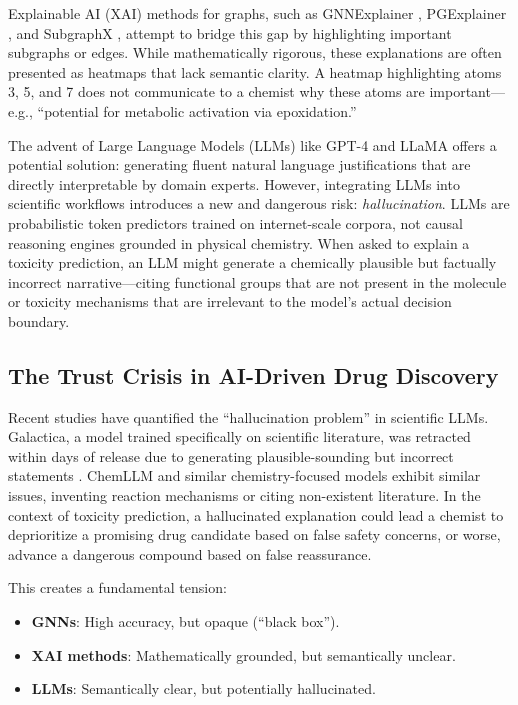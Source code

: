 \documentclass[conference]{IEEEtran}
\begin{document}
Explainable AI (XAI) methods for graphs, such as GNNExplainer \cite{ying2019gnnexplainer}, PGExplainer \cite{luo2020parameterized}, and SubgraphX \cite{yuan2021explainability}, attempt to bridge this gap by highlighting important subgraphs or edges. While mathematically rigorous, these explanations are often presented as heatmaps that lack semantic clarity. A heatmap highlighting atoms 3, 5, and 7 does not communicate to a chemist why these atoms are important---e.g., ``potential for metabolic activation via epoxidation.''

The advent of Large Language Models (LLMs) like GPT-4 \cite{openai2023gpt4} and LLaMA \cite{touvron2023llama} offers a potential solution: generating fluent natural language justifications that are directly interpretable by domain experts. However, integrating LLMs into scientific workflows introduces a new and dangerous risk: \textit{hallucination}. LLMs are probabilistic token predictors trained on internet-scale corpora, not causal reasoning engines grounded in physical chemistry. When asked to explain a toxicity prediction, an LLM might generate a chemically plausible but factually incorrect narrative---citing functional groups that are not present in the molecule or toxicity mechanisms that are irrelevant to the model's actual decision boundary.

\subsection{The Trust Crisis in AI-Driven Drug Discovery}

Recent studies have quantified the ``hallucination problem'' in scientific LLMs. Galactica, a model trained specifically on scientific literature, was retracted within days of release due to generating plausible-sounding but incorrect statements \cite{taylor2022galactica}. ChemLLM and similar chemistry-focused models exhibit similar issues, inventing reaction mechanisms or citing non-existent literature. In the context of toxicity prediction, a hallucinated explanation could lead a chemist to deprioritize a promising drug candidate based on false safety concerns, or worse, advance a dangerous compound based on false reassurance.

This creates a fundamental tension:
\begin{itemize}
    \item \textbf{GNNs}: High accuracy, but opaque (``black box'').
    \item \textbf{XAI methods}: Mathematically grounded, but semantically unclear.
    \item \textbf{LLMs}: Semantically clear, but potentially hallucinated.
\end{itemize}
\end{document}
